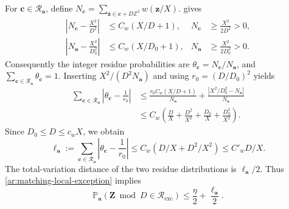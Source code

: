 \documentclass[twoside]{aomart}
\makeatletter
\theoremstyle{paperplain}
\theoremstyle{paperdefinition}
\renewenvironment{proof}[1][\proofname]{\par\pushQED{\qed}%
  \normalfont\topsep6\p@\@plus3\p@\relax\trivlist
  \item[\hskip\labelsep\itshape #1\@addpunct{.}]\ignorespaces
}{\popQED\endtrivlist\@endpefalse}
\newcommand{\Z}{\mathbb Z}
\newcommand{\Pp}{\mathbb P}
\numberwithin{equation}{section}
\makeatother
\begin{document}
\begin{proof}
For $\mathbf c\in\mathcal R_{\mathbf a}$, define
$\displaystyle N_{\mathbf c}=\sum_{\mathbf z\in\mathbf c+D\Z^2}w(\mathbf z/X)$.
 gives
\begin{equation}
 \begin{aligned}
 \left|N_{\mathbf c}-\frac{X^2}{D^2}\right|
 &\le C_w(X/D+1),&
 N_{\mathbf c}&\ge\frac{X^2}{2D^2}>0,\\
 \left|N_{\mathbf a}-\frac{X^2}{D_0^2}\right|
 &\le C_w(X/D_0+1),&
 N_{\mathbf a}&\ge\frac{X^2}{2D_0^2}>0.
 \end{aligned}
 \label{ar:matching-coset-normalization}
\end{equation}
Consequently the integer residue probabilities are
$\theta_{\mathbf c}=N_{\mathbf c}/N_{\mathbf a}$, and
$\displaystyle \sum_{\mathbf c\in\mathcal R_{\mathbf a}}\theta_{\mathbf c}=1$.
Inserting $X^2/(D^2N_{\mathbf a})$ and using $r_0=(D/D_0)^2$ yields
\begin{equation*}
 \begin{aligned}
 \sum_{\mathbf c\in\mathcal R_{\mathbf a}}
       \left|\theta_{\mathbf c}-\frac1{r_0}\right|
 &\le\frac{r_0C_w(X/D+1)}{N_{\mathbf a}}
       +\frac{|X^2/D_0^2-N_{\mathbf a}|}{N_{\mathbf a}}\\
 &\le C_w\left(\frac D X+\frac{D^2}{X^2}
                       +\frac{D_0}X+\frac{D_0^2}{X^2}\right).
 \end{aligned}
\end{equation*}
Since $D_0\le D\le c_wX$, we obtain
\begin{equation*}
 \ell_{\mathbf a}:=
 \sum_{\mathbf c\in\mathcal R_{\mathbf a}}
       \left|\theta_{\mathbf c}-\frac1{r_0}\right|
 \le C_w(D/X+D^2/X^2)\le C'_wD/X.
\end{equation*}
The total-variation distance of the two residue distributions is
$\ell_{\mathbf a}/2$. Thus \eqref{ar:matching-local-exception} implies
\begin{equation}
 \Pp_{\mathbf a}(\mathbf Z\bmod D\in\mathcal R_{\mathrm{exc}})
 \le\frac\eta2+\frac{\ell_{\mathbf a}}2.
 \label{ar:matching-integer-exception}
\end{equation}


\end{proof}
\end{document}
